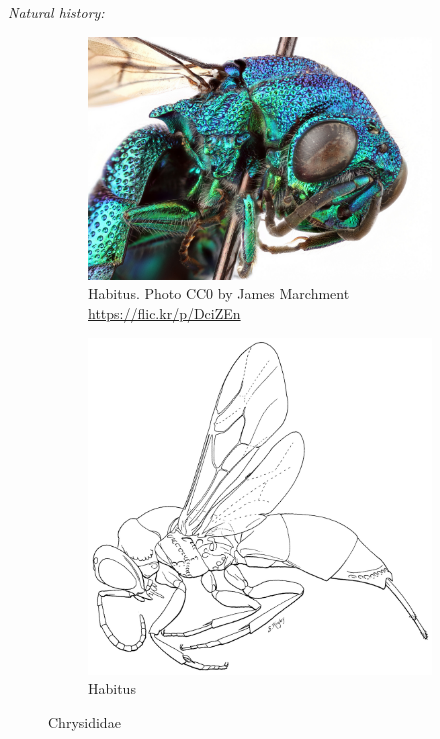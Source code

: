 \documentclass[letterpaper, 11pt]{article}
\begin{document}
\noindent{}\textit{Natural history:} \\

\begin{figure}[ht!]
    \centering
    \begin{subfigure}[ht!]{0.42\textwidth}
        \includegraphics[width=\textwidth]{ChrysididColor}
        \caption{Habitus. Photo CC0 by James Marchment \url{https://flic.kr/p/DciZEn}}
        \label{fig:chrysid1}
    \end{subfigure}
    \qquad
    \begin{subfigure}[ht!]{0.39\textwidth}
        \includegraphics[width=\textwidth]{ChrysididHabitus}
        \caption{Habitus \citep[][Fig. 42]{goulet1993hymenoptera}}
        \label{fig:chrysid2}
    \end{subfigure}
    \caption{Chrysididae}\label{fig:chrysididae}
\end{figure}
\FloatBarrier
\end{document}
